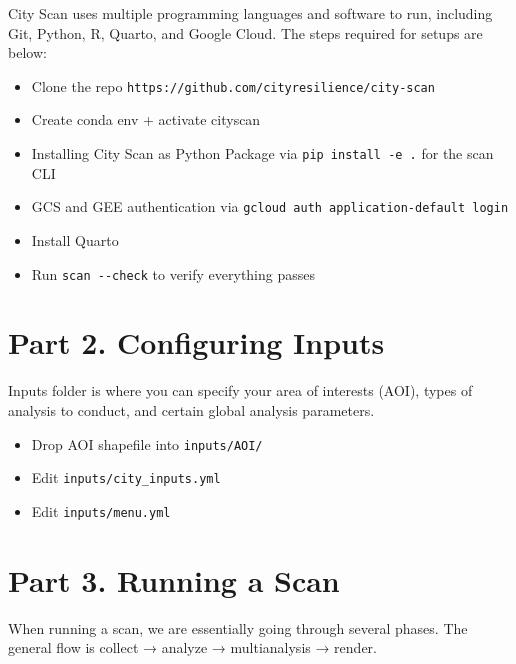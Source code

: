 \documentclass[
  letterpaper,
  DIV=11,
  numbers=noendperiod]{scrreprt}
\providecommand{\tightlist}{%
  \setlength{\itemsep}{0pt}\setlength{\parskip}{0pt}}
\begin{document}
City Scan uses multiple programming languages and software to run,
including Git, Python, R, Quarto, and Google Cloud. The steps required
for setups are below:

\begin{itemize}
\tightlist
\item
  Clone the repo \texttt{https://github.com/cityresilience/city-scan}
\item
  Create conda env + activate cityscan
\item
  Installing City Scan as Python Package via
  \texttt{pip\ install\ -e\ .} for the scan CLI
\item
  GCS and GEE authentication via
  \texttt{gcloud\ auth\ application-default\ login}
\item
  Install Quarto
\item
  Run \texttt{scan\ -\/-check} to verify everything passes
\end{itemize}

\section{Part 2. Configuring Inputs}\label{part-2.-configuring-inputs}

Inputs folder is where you can specify your area of interests (AOI),
types of analysis to conduct, and certain global analysis parameters.

\begin{itemize}
\tightlist
\item
  Drop AOI shapefile into \texttt{inputs/AOI/}
\item
  Edit \texttt{inputs/city\_inputs.yml}
\item
  Edit \texttt{inputs/menu.yml}
\end{itemize}

\section{Part 3. Running a Scan}\label{part-3.-running-a-scan}

When running a scan, we are essentially going through several phases.
The general flow is collect → analyze → multianalysis → render.
\end{document}
